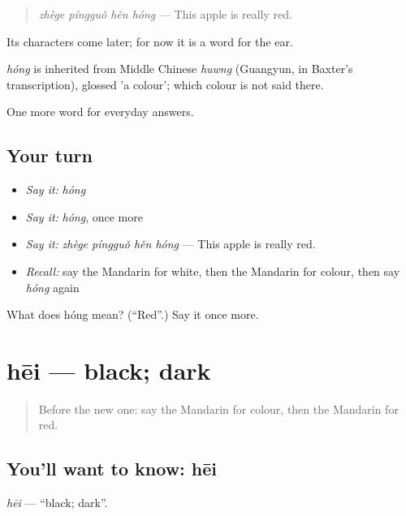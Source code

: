 \begin{quote}
\emph{zhège píngguǒ hěn hóng} — This apple is really red.
\end{quote}

Its characters come later; for now it is a word for the ear.

\begin{cousinweb}
\emph{hóng} is inherited from Middle Chinese \emph{huwng} (Guangyun, in Baxter's transcription), glossed 'a colour'; which colour is not said there.
\end{cousinweb}

\begin{grammarlens}[title={What you've built}]
One more word for everyday answers.
\end{grammarlens}

\subsection*{Your turn}
\begin{itemize}
\raggedright
  \item \emph{Say it:} \emph{hóng}
  \item \emph{Say it:} \emph{hóng}, once more
  \item \emph{Say it:} \emph{zhège píngguǒ hěn hóng} — This apple is really red.
  \item \emph{Recall:} say the Mandarin for white, then the Mandarin for colour, then say \emph{hóng} again
\end{itemize}

\begin{tcolorbox}[breakable,colback=teal!4,colframe=teal!35!black,title={Before you move on}]
What does hóng mean? (\textquotedblleft{}Red\textquotedblright{}.) Say it once more.
\end{tcolorbox}
\section[hēi]{hēi — black; dark}

\label{lesson:ZH-C60-hei}



\begin{quote}
Before the new one: say the Mandarin for colour, then the Mandarin for red.
\end{quote}

\subsection*{You'll want to know: hēi}
\emph{hēi} — \textquotedblleft{}black; dark\textquotedblright{}.


